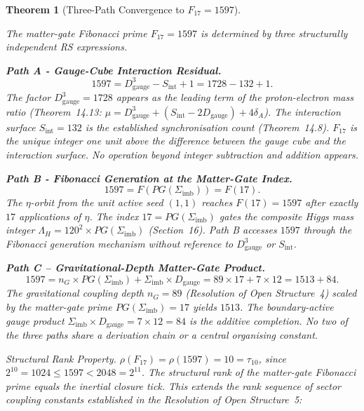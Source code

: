 \documentclass[11pt, letterpaper]{article}
\theoremstyle{definition}
\theoremstyle{plain}
\newtheorem{theorem}{Theorem}[section]
\begin{document}
\begin{theorem}[Three-Path Convergence to $F_{17} = 1597$]
\begin{rsbox}
The matter-gate Fibonacci prime $F_{17} = 1597$ is determined by three structurally
independent RS expressions.

\medskip
\noindent\textbf{Path A - Gauge-Cube Interaction Residual.}
\[
1597 = D_{\mathrm{gauge}}^3 - S_{\mathrm{int}} + 1 = 1728 - 132 + 1.
\]
The factor $D_{\mathrm{gauge}}^3 = 1728$ appears as the leading term of the
proton-electron mass ratio (Theorem~14.13:
$\mu = D_{\mathrm{gauge}}^3 + (S_{\mathrm{int}} - 2D_{\mathrm{gauge}}) + 4\delta_A$).
The interaction surface $S_{\mathrm{int}} = 132$ is the established synchronisation count
(Theorem~14.8). $F_{17}$ is the unique integer one unit above the difference between the
gauge cube and the interaction surface. No operation beyond integer subtraction and
addition appears.

\medskip
\noindent\textbf{Path B - Fibonacci Generation at the Matter-Gate Index.}
\[
1597 = F(PG(\Sigma_{\mathrm{imb}})) = F(17).
\]
The $\eta$-orbit from the unit active seed $(1,1)$ reaches $F(17) = 1597$ after exactly $17$
applications of $\eta$. The index $17 = PG(\Sigma_{\mathrm{imb}})$ gates the composite
Higgs mass integer $\Lambda_H = 120^2 \times PG(\Sigma_{\mathrm{imb}})$ (Section~16).
Path B accesses $1597$ through the Fibonacci generation mechanism without reference to
$D_{\mathrm{gauge}}^3$ or $S_{\mathrm{int}}$.

\medskip
\noindent\textbf{Path C -- Gravitational-Depth Matter-Gate Product.}
\[
1597 = n_G \times PG(\Sigma_{\mathrm{imb}}) + \Sigma_{\mathrm{imb}} \times D_{\mathrm{gauge}}
     = 89 \times 17 + 7 \times 12 = 1513 + 84.
\]
The gravitational coupling depth $n_G = 89$ (Resolution of Open Structure~4) scaled by
the matter-gate prime $PG(\Sigma_{\mathrm{imb}}) = 17$ yields $1513$. The boundary-active
gauge product $\Sigma_{\mathrm{imb}} \times D_{\mathrm{gauge}} = 7 \times 12 = 84$ is the
additive completion. No two of the three paths share a derivation chain or a central
organising constant.
\end{rsbox}

\noindent\textit{Structural Rank Property.}
$\rho(F_{17}) = \rho(1597) = 10 = \tau_{10}$, since $2^{10} = 1024 \leq 1597 < 2048 = 2^{11}$.
The structural rank of the matter-gate Fibonacci prime equals the inertial closure tick.
This extends the rank sequence of sector coupling constants established in the Resolution
of Open Structure~5:


\end{theorem}
\end{document}
